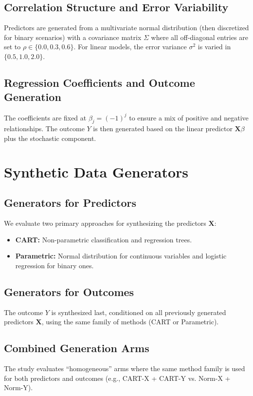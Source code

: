 \subsection{Correlation Structure and Error Variability}
Predictors are generated from a multivariate normal distribution (then discretized for binary scenarios) with a covariance matrix $\Sigma$ where all off-diagonal entries are set to $\rho \in \{0.0, 0.3, 0.6\}$. For linear models, the error variance $\sigma^2$ is varied in $\{0.5, 1.0, 2.0\}$.

\subsection{Regression Coefficients and Outcome Generation}
The coefficients are fixed at $\beta_j = (-1)^j$ to ensure a mix of positive and negative relationships. The outcome $Y$ is then generated based on the linear predictor $\mathbf{X}\beta$ plus the stochastic component.

\section{Synthetic Data Generators}
\label{sec:reg-generators}

\subsection{Generators for Predictors}
We evaluate two primary approaches for synthesizing the predictors $\mathbf{X}$:
\begin{itemize}
    \item \textbf{CART:} Non-parametric classification and regression trees.
    \item \textbf{Parametric:} Normal distribution for continuous variables and logistic regression for binary ones.
\end{itemize}

\subsection{Generators for Outcomes}
The outcome $Y$ is synthesized last, conditioned on all previously generated predictors $\mathbf{X}$, using the same family of methods (CART or Parametric).

\subsection{Combined Generation Arms}
The study evaluates ``homogeneous'' arms where the same method family is used for both predictors and outcomes (e.g., CART-X + CART-Y vs. Norm-X + Norm-Y).

